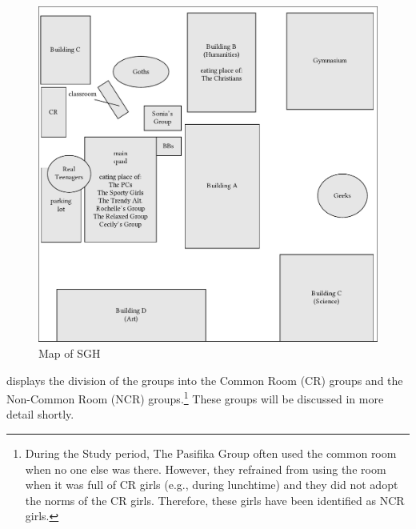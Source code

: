 \begin{figure}[p]
	\centering
		\includegraphics[width=\textwidth]{images/mySGHmap.pdf}
	\caption{Map of SGH}
	\label{fig:mySGHmap}
\end{figure}



 displays the division of the groups into the Common Room (CR) groups and the Non-Common Room (NCR) groups.\footnote{During the Study period, The Pasifika Group often used the common room when no one else was there. However, they refrained from using the room when it was full of CR girls (e.g., during lunchtime) and they did not adopt the norms of the CR girls. Therefore, these girls have been identified as NCR girls.}  These groups will be discussed in more detail shortly.

     
     
